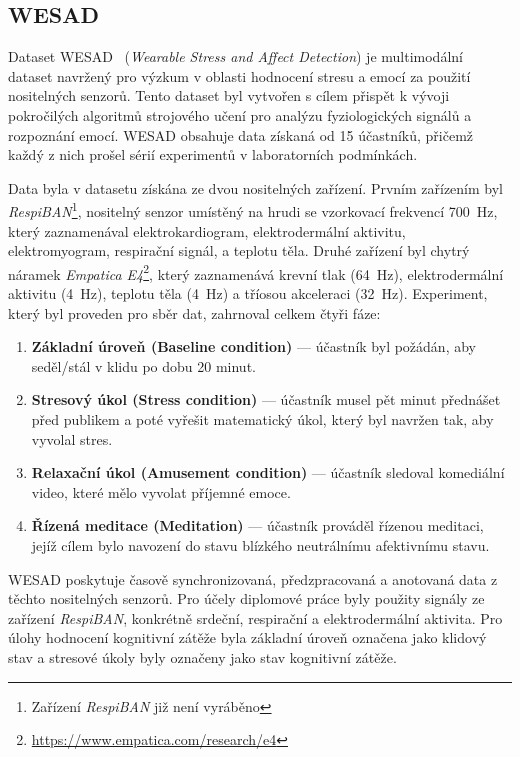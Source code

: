 \subsection{WESAD}
\label{subsec:wesad}
Dataset WESAD~\cite{wesadDataset} (\textit{Wearable Stress and Affect
Detection}) je multimodální dataset navržený pro výzkum v oblasti hodnocení
stresu a emocí za použití nositelných senzorů. Tento dataset byl vytvořen s
cílem přispět k vývoji pokročilých algoritmů strojového učení pro analýzu
fyziologických signálů a rozpoznání emocí. WESAD obsahuje data získaná od 15
účastníků, přičemž každý z nich prošel sérií experimentů v laboratorních
podmínkách.

Data byla v datasetu získána ze dvou nositelných zařízení. Prvním zařízením byl
\textit{RespiBAN}\footnote{Zařízení \textit{RespiBAN} již není vyráběno},
nositelný senzor umístěný na hrudi se vzorkovací frekvencí 700~Hz, který
zaznamenával elektrokardiogram, elektrodermální aktivitu, elektromyogram,
respirační signál, a teplotu těla. Druhé zařízení byl chytrý náramek
\textit{Empatica E4}\footnote{\url{https://www.empatica.com/research/e4}}, který
zaznamenává krevní tlak (64~Hz), elektrodermální aktivitu (4~Hz), teplotu těla
(4~Hz) a tříosou akceleraci (32~Hz). Experiment, který byl proveden pro sběr
dat, zahrnoval celkem čtyři fáze:
\begin{enumerate}
    \item \textbf{Základní úroveň (Baseline condition)} --- účastník byl požádán, aby
    seděl/stál v klidu po dobu 20 minut.
    \item  \textbf{Stresový úkol (Stress condition)} --- účastník musel pět minut
    přednášet před publikem a poté vyřešit matematický úkol, který byl navržen
    tak, aby vyvolal stres.
    \item  \textbf{Relaxační úkol (Amusement condition)} --- účastník sledoval
    komediální video, které mělo vyvolat příjemné emoce.
    \item  \textbf{Řízená meditace (Meditation)} --- účastník prováděl řízenou
    meditaci, jejíž cílem bylo navození do stavu blízkého neutrálnímu
    afektivnímu stavu.
\end{enumerate}

WESAD poskytuje časově synchronizovaná, předzpracovaná a anotovaná data z těchto
nositelných senzorů. Pro účely diplomové práce byly použity signály ze zařízení
\textit{RespiBAN}, konkrétně srdeční, respirační a elektrodermální aktivita. Pro
úlohy hodnocení kognitivní zátěže byla základní úroveň označena jako klidový stav
a stresové úkoly byly označeny jako stav kognitivní zátěže.

